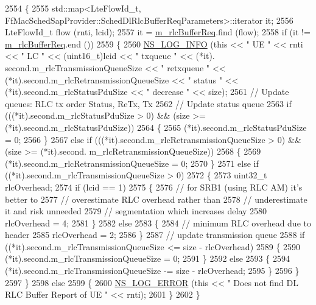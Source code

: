 \begin{DoxyCode}
2554 \{
2555   std::map<LteFlowId\_t, FfMacSchedSapProvider::SchedDlRlcBufferReqParameters>::iterator it;
2556   LteFlowId\_t flow (rnti, lcid);
2557   it = \hyperlink{classns3_1_1CqaFfMacScheduler_ae9f6c7fc32e6dd08573470c70d827610}{m\_rlcBufferReq}.find (flow);
2558   \textcolor{keywordflow}{if} (it != \hyperlink{classns3_1_1CqaFfMacScheduler_ae9f6c7fc32e6dd08573470c70d827610}{m\_rlcBufferReq}.end ())
2559     \{
2560       \hyperlink{group__logging_gafbd73ee2cf9f26b319f49086d8e860fb}{NS\_LOG\_INFO} (\textcolor{keyword}{this} << \textcolor{stringliteral}{" UE "} << rnti << \textcolor{stringliteral}{" LC "} << (uint16\_t)lcid << \textcolor{stringliteral}{" txqueue "} << (*it).
      second.m\_rlcTransmissionQueueSize << \textcolor{stringliteral}{" retxqueue "} << (*it).second.m\_rlcRetransmissionQueueSize << \textcolor{stringliteral}{" status "} 
      << (*it).second.m\_rlcStatusPduSize << \textcolor{stringliteral}{" decrease "} << size);
2561       \textcolor{comment}{// Update queues: RLC tx order Status, ReTx, Tx}
2562       \textcolor{comment}{// Update status queue}
2563       \textcolor{keywordflow}{if} (((*it).second.m\_rlcStatusPduSize > 0) && (size >= (*it).second.m\_rlcStatusPduSize))
2564         \{
2565           (*it).second.m\_rlcStatusPduSize = 0;
2566         \}
2567       \textcolor{keywordflow}{else} \textcolor{keywordflow}{if} (((*it).second.m\_rlcRetransmissionQueueSize > 0) && (size >= (*it).second.
      m\_rlcRetransmissionQueueSize))
2568         \{
2569           (*it).second.m\_rlcRetransmissionQueueSize = 0;
2570         \}
2571       \textcolor{keywordflow}{else} \textcolor{keywordflow}{if} ((*it).second.m\_rlcTransmissionQueueSize > 0)
2572         \{
2573           uint32\_t rlcOverhead;
2574           \textcolor{keywordflow}{if} (lcid == 1)
2575             \{
2576               \textcolor{comment}{// for SRB1 (using RLC AM) it's better to}
2577               \textcolor{comment}{// overestimate RLC overhead rather than}
2578               \textcolor{comment}{// underestimate it and risk unneeded}
2579               \textcolor{comment}{// segmentation which increases delay }
2580               rlcOverhead = 4;
2581             \}
2582           \textcolor{keywordflow}{else}
2583             \{
2584               \textcolor{comment}{// minimum RLC overhead due to header}
2585               rlcOverhead = 2;
2586             \}
2587           \textcolor{comment}{// update transmission queue}
2588           \textcolor{keywordflow}{if} ((*it).second.m\_rlcTransmissionQueueSize <= size - rlcOverhead)
2589             \{
2590               (*it).second.m\_rlcTransmissionQueueSize = 0;
2591             \}
2592           \textcolor{keywordflow}{else}
2593             \{
2594               (*it).second.m\_rlcTransmissionQueueSize -= size - rlcOverhead;
2595             \}
2596         \}
2597     \}
2598   \textcolor{keywordflow}{else}
2599     \{
2600       \hyperlink{group__logging_ga0261a8db1d4ac5f79417d117634fd455}{NS\_LOG\_ERROR} (\textcolor{keyword}{this} << \textcolor{stringliteral}{" Does not find DL RLC Buffer Report of UE "} << rnti);
2601     \}
2602 \}
\end{DoxyCode}


